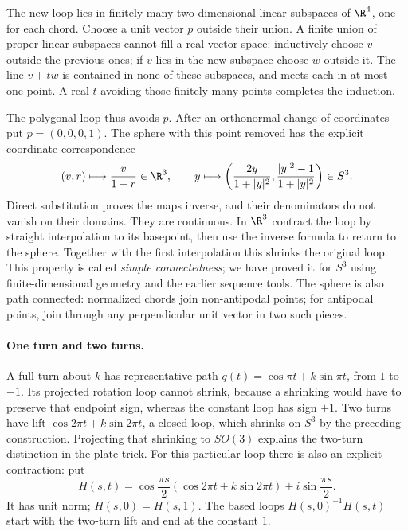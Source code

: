 The new loop lies in finitely many two-dimensional linear subspaces of
$\R^4$, one for each chord. Choose a unit vector $p$ outside their union.
A finite union of proper linear subspaces cannot fill a real vector space:
inductively choose $v$ outside the previous ones; if $v$ lies in the new
subspace choose $w$ outside it. The line $v+tw$ is contained in none of
these subspaces, and meets each in at most one point. A real $t$ avoiding
those finitely many points completes the induction.

The polygonal loop thus avoids $p$. After an orthonormal change of coordinates
put $p=(0,0,0,1)$. The sphere with this point removed has the explicit
coordinate correspondence
\[
(v,r)\longmapsto\frac{v}{1-r}\in\R^3,
\qquad
y\longmapsto
\left(\frac{2y}{1+|y|^2},\frac{|y|^2-1}{1+|y|^2}\right)\in S^3.
\]
Direct substitution proves the maps inverse, and their denominators do not
vanish on their domains. They are continuous.
In $\R^3$ contract the loop by straight interpolation to its basepoint,
then use the inverse formula to return to the sphere.
Together with the first interpolation this shrinks the original loop.
This property is called \emph{simple connectedness}; we have proved it
for $S^3$ using finite-dimensional geometry and the earlier sequence tools. The sphere is also path connected: normalized chords join non-antipodal points; for antipodal points, join through any perpendicular unit vector in two such pieces.

\paragraph{One turn and two turns.}
A full turn about $k$ has representative path
$q(t)=\cos\pi t+k\sin\pi t$, from $1$ to $-1$.
Its projected rotation loop cannot shrink, because a shrinking would have
to preserve that endpoint sign, whereas the constant loop has sign $+1$.
Two turns have lift $\cos2\pi t+k\sin2\pi t$, a closed loop, which shrinks
on $S^3$ by the preceding construction. Projecting that shrinking to
$SO(3)$ explains the two-turn distinction in the plate trick.
For this particular loop there is also an explicit contraction: put
\[
H(s,t)=\cos\frac{\pi s}{2}
       (\cos2\pi t+k\sin2\pi t)+i\sin\frac{\pi s}{2}.
\]
It has unit norm; $H(s,0)=H(s,1)$. The based loops
$H(s,0)^{-1}H(s,t)$ start with the two-turn lift and end at the constant $1$.

